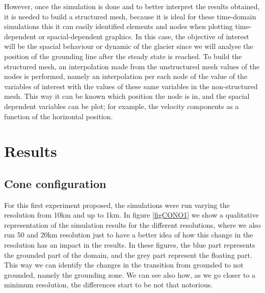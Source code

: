 \documentclass{article}
\begin{document}
However, once the simulation is done and to better interpret the results obtained, it is needed to build a structured mesh, because it is ideal for these time-domain simulations this it can  easily identified elements and nodes when plotting time-dependent or spacial-dependent graphics. In this case, the objective of interest will be the spacial behaviour or dynamic of the glacier since we will analyse the position of the grounding line after the steady state is reached. To build the structured mesh, an interpolation made from the unstructured mesh values of the nodes is performed, namely an interpolation per each node of the value of the variables of interest with the values of these same variables in the non-structured mesh. This way it can be known which position the node is in, and the spacial dependent variables can be plot; for example, the velocity components as a function of the horizontal position. 

\section{Results}
\subsection{Cone configuration}

For this first experiment proposed, the simulations were run varying the resolution from 10km and up to 1km. In figure \ref{figCONO1} we show a qualitative representation of the simulation results for the different resolutions, where we also run 50 and 20km resolution just to have a better idea of how this change in the resolution has an impact in the results. In these figures, the blue part represents the grounded part of the domain, and the grey part represent the floating part. This way we can identify the changes in the transition from grounded to not grounded, namely the grounding zone. We can see also how, as we go closer to a minimum resolution, the differences start to be not that notorious. 
\end{document}
